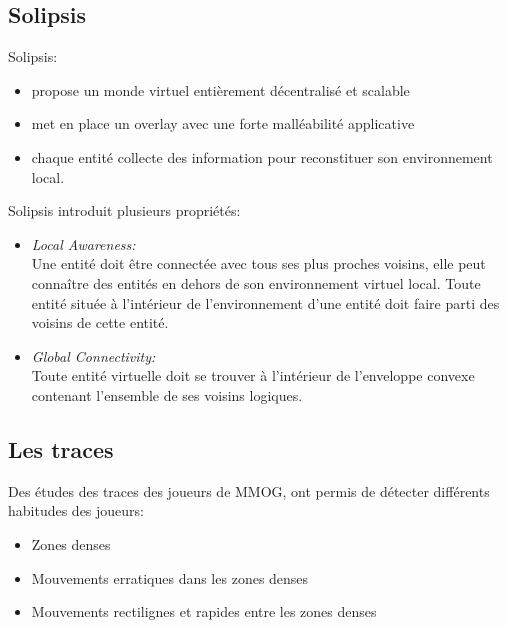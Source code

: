 \documentclass{beamer}
\begin{document}
  \subsection{Solipsis}

  \begin{frame}
	Solipsis:\\
	\begin{itemize}
		\item propose un monde virtuel entièrement décentralisé et scalable\\
		\item met en place un overlay avec une forte malléabilité applicative\\
		\item chaque entité collecte des information pour reconstituer son environnement local.\\
	\end{itemize}
  \end{frame}

  \begin{frame}
	Solipsis introduit plusieurs propriétés:
	\begin{itemize}
                \item \textit{Local Awareness:}\\
                Une entité doit être connectée avec tous ses plus proches voisins, elle peut connaître des entités en dehors de son environnement virtuel local. Toute entité située à l'intérieur de l'environnement d'une entité doit faire parti des voisins de cette entité.
                \item \textit{Global Connectivity:}\\
                Toute entité virtuelle doit se trouver à l'intérieur de l'enveloppe convexe contenant l'ensemble de ses voisins logiques. \\
	\end{itemize}
  \end{frame}

  \subsection{Les traces}
  \begin{frame}
	Des études des traces des joueurs de MMOG, ont permis de détecter différents habitudes des joueurs:
	\begin{itemize}
		\item Zones denses 
		\item Mouvements erratiques dans les zones denses
		\item Mouvements rectilignes et rapides entre les zones denses
	\end{itemize}
  \end{frame}
\end{document}
